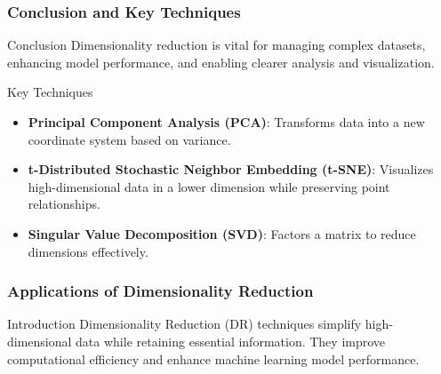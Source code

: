 \documentclass[aspectratio=169]{beamer}
\begin{document}
\begin{frame}[fragile]
    \frametitle{Conclusion and Key Techniques}
    \begin{block}{Conclusion}
        Dimensionality reduction is vital for managing complex datasets, enhancing model performance, and enabling clearer analysis and visualization.
    \end{block}

    \begin{block}{Key Techniques}
        \begin{itemize}
            \item \textbf{Principal Component Analysis (PCA)}: Transforms data into a new coordinate system based on variance.
            \item \textbf{t-Distributed Stochastic Neighbor Embedding (t-SNE)}: Visualizes high-dimensional data in a lower dimension while preserving point relationships.
            \item \textbf{Singular Value Decomposition (SVD)}: Factors a matrix to reduce dimensions effectively.
        \end{itemize}
    \end{block}
\end{frame}

\begin{frame}[fragile]
    \frametitle{Applications of Dimensionality Reduction}
    \begin{block}{Introduction}
        Dimensionality Reduction (DR) techniques simplify high-dimensional data while retaining essential information. They improve computational efficiency and enhance machine learning model performance.
    \end{block}
\end{frame}
\end{document}
